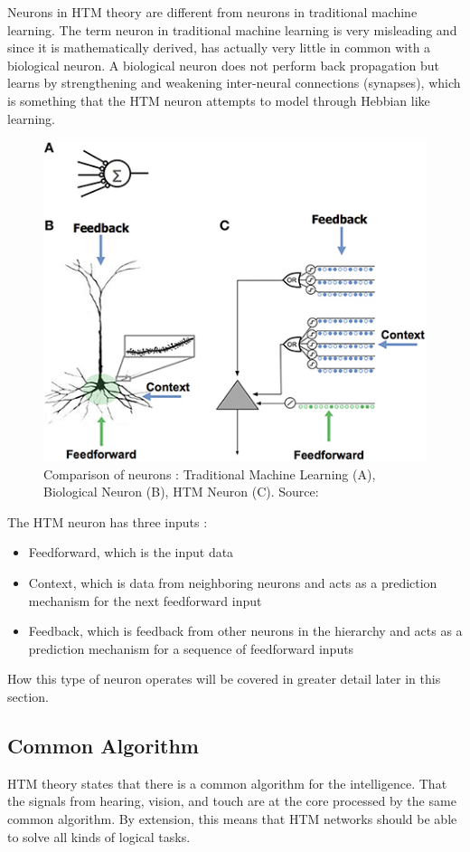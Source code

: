 Neurons in HTM theory are different from neurons in traditional machine learning. The term neuron in traditional machine learning is very misleading and since it is mathematically derived, has actually very little in common with a biological neuron. A biological neuron does not perform back propagation but learns by strengthening and weakening inter-neural connections (synapses), which is something that the HTM neuron attempts to model through Hebbian like learning.
\begin{figure}[H]
    \centering
    \includegraphics[width=\linewidth]{resources/related_works/neuron_comparison.jpg}
    \caption{Comparison of neurons \protect\cite{htm_neurons}: Traditional Machine Learning (A), Biological Neuron (B), HTM Neuron (C). Source: \cite{BAMI}}
    \label{fig:neuron_comparison}
\end{figure}
The HTM neuron has three inputs \cite{htm_neurons}:
\begin{itemize}
    \item Feedforward, which is the input data
    \item Context, which is data from neighboring neurons and acts as a prediction mechanism for the next feedforward input
    \item Feedback, which is feedback from other neurons in the hierarchy and acts as a prediction mechanism for a sequence of feedforward inputs
\end{itemize}
How this type of neuron operates will be covered in greater detail later in this section.
\subsection{Common Algorithm}
HTM theory states that there is a common algorithm for the intelligence. That the signals from hearing, vision, and touch are at the core processed by the same common algorithm. By extension, this means that HTM networks should be able to solve all kinds of logical tasks.
